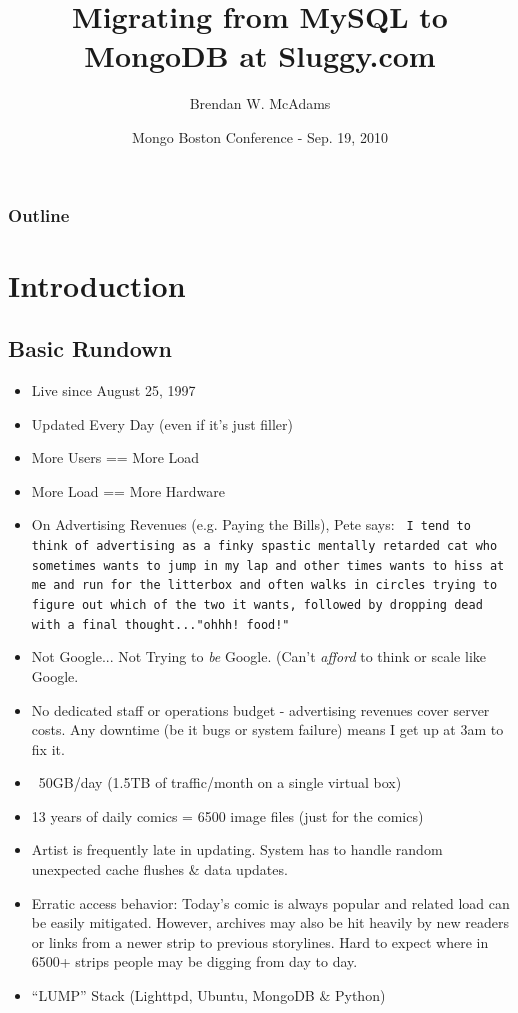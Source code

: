 \documentclass{beamer}
\title[Sluggy.com: MySQL to MongoDB]{Migrating from MySQL to MongoDB at Sluggy.com} %
\author[B.W. McAdams]{Brendan W. McAdams}
\institute[Sluggy Freelance]{Sluggy Freelance, LLC}
\institute[Evil Monkey Labs]{Evil Monkey Labs, LLC}
\date[Mongo Boston - 9/20/10]
     {Mongo Boston Conference - Sep. 19, 2010}
\newenvironment{itemizeframe}
               {\begin{frame}\startitemizeframe} 
               {\stopitemizeframe\end{frame}}
\newcommand\startitemizeframe{\begin{itemize}} \newcommand\stopitemizeframe{\end{itemize}}
\begin{document}
\begin{frame}
  \titlepage
\end{frame}

\begin{frame}
\frametitle{Outline}
  \tableofcontents
\end{frame}

\section{Introduction}

\subsection[About Sluggy.com]{Basic Rundown}
\begin{itemizeframe}
    \frametitle{Sluggy.com Rundown}
	\item Live since August 25, 1997
	\item Updated Every Day (even if it's just filler)
	\item More Users == More Load
	\item More Load == More Hardware
	\item<2-> On Advertising Revenues (e.g. Paying the Bills), Pete says: \texttt{\tiny
	 I tend to think of advertising as a finky spastic mentally retarded cat who sometimes wants to jump in my lap and other times wants to hiss at me and run for the litterbox and often walks in circles trying to figure out which of the two it wants, followed by dropping dead with a final thought..."ohhh! food!"}
	\item<3-> Not Google... Not Trying to {\em be} Google. (Can't {\em afford } to think or scale like Google.
	\item<3-> No dedicated staff or operations budget - advertising revenues cover server costs. Any downtime (be it bugs or system failure) means I get up at 3am to fix it.
\end{itemizeframe}

\begin{itemizeframe}
    \frametitle{Sluggy.com Rundown}
    \framesubtitle{Some Stats}
	\item ~50GB/day (1.5TB of traffic/month on a single virtual box)
	\item 13 years of daily comics = 6500 image files (just for the comics)
	\item Artist is frequently late in updating.  System has to handle random unexpected cache flushes \& data updates.
	\item Erratic access behavior: Today's comic is always popular and related load can be easily mitigated.  However, archives may also be hit heavily by new readers or links from a newer strip to previous storylines.  Hard to expect where in 6500+ strips people may be digging from day to day.
	\item ``LUMP'' Stack (Lighttpd, Ubuntu, MongoDB \& Python)
\end{itemizeframe}
\end{document}
